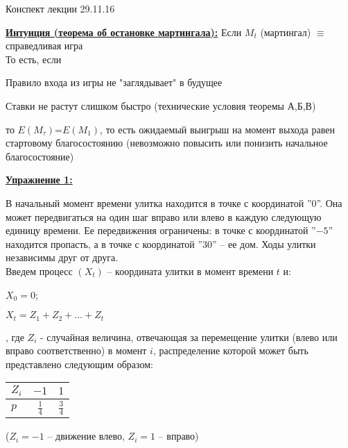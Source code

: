 \documentclass[a4paper]{article}
\begin{document}
 \begin{center}
 {\Large{Конспект лекции 29.11.16}}
 \end{center}
 \par {\bf\underline{Интуиция (теорема об остановке мартингала):}} Если ${M}_t$ (мартингал) $\equiv$ справедливая игра \\ То есть, если \begin{enumerate*}[label={\alph*)},font={\color{red!50!black}\bfseries}] \item Правило входа из игры не "заглядывает" в будущее \item Ставки не растут слишком быстро (технические условия теоремы А,Б,В) \end{enumerate*} то $E({M}_\tau)$=$E({M}_1)$, то есть ожидаемый выигрыш на момент выхода равен стартовому благосостоянию (невозможно повысить или понизить начальное благосостояние)
 \\
 \par {\bf\underline{Упражнение 1:}} 
\begin{figure}[h]
\label{image}
\end{figure}
В начальный момент времени улитка находится в точке с координатой ''$0$''. Она может передвигаться на один шаг вправо или влево в каждую следующую единицу времени. Ее передвижения ограничены: в точке с координатой ''$-5$'' находится пропасть, а в точке с координатой ''$30$'' -- ее дом.
 Ходы улитки независимы друг от друга. \\
 Введем процесс $({X}_t)$ -- координата улитки в момент времени $t$ и: \begin{enumerate*}[font={\color{red!50!black}\bfseries}] \item ${X}_0=0$; \item ${X}_t={Z}_1+{Z}_2+\dots+{Z}_t$ \end{enumerate*}, где ${Z}_i$ - случайная величина, отвечающая за перемещение улитки (влево или вправо соответственно) в момент $i$, распределение которой может быть представлено следующим образом:
\begin{table}[h]
\centering
\begin{tabular}{l|c|c}
${Z}_i$ & $-1$ & $1$ \\ \hline
$p$ & $\frac{1}{4}$ & $\frac{3}{4}$  
\end{tabular}
\end{table}
(${Z}_i=-1$ -- движение влево, ${Z}_i=1$ -- вправо)
\end{document}
